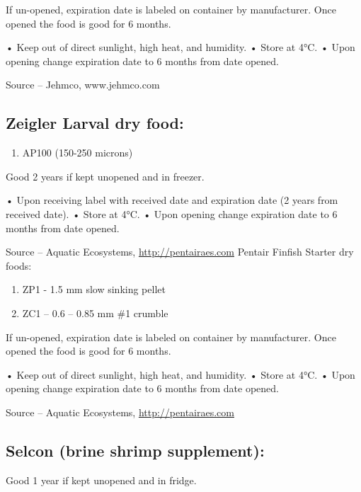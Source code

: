 \documentclass[
]{book}
\providecommand{\tightlist}{%
  \setlength{\itemsep}{0pt}\setlength{\parskip}{0pt}}
\begin{document}
If un-opened, expiration date is labeled on container by manufacturer. Once opened the food is good for 6 months.

• Keep out of direct sunlight, high heat, and humidity.
• Store at 4°C.
• Upon opening change expiration date to 6 months from date opened.

Source -- Jehmco, www.jehmco.com

\hypertarget{zeigler-larval-dry-food}{%
\subsection{Zeigler Larval dry food:}\label{zeigler-larval-dry-food}}

\begin{enumerate}
\def\labelenumi{\arabic{enumi}.}
\tightlist
\item
  AP100 (150-250 microns)
\end{enumerate}

Good 2 years if kept unopened and in freezer.

• Upon receiving label with received date and expiration date (2 years from received date).
• Store at 4°C.
• Upon opening change expiration date to 6 months from date opened.

Source -- Aquatic Ecosystems, \url{http://pentairaes.com}
Pentair Finfish Starter dry foods:

\begin{enumerate}
\def\labelenumi{\arabic{enumi}.}
\setcounter{enumi}{1}
\tightlist
\item
  ZP1 - 1.5 mm slow sinking pellet
\item
  ZC1 -- 0.6 -- 0.85 mm \#1 crumble
\end{enumerate}

If un-opened, expiration date is labeled on container by manufacturer. Once opened the food is good for 6 months.

• Keep out of direct sunlight, high heat, and humidity.
• Store at 4°C.
• Upon opening change expiration date to 6 months from date opened.

Source -- Aquatic Ecosystems, \url{http://pentairaes.com}

\hypertarget{selcon-brine-shrimp-supplement}{%
\subsection{Selcon (brine shrimp supplement):}\label{selcon-brine-shrimp-supplement}}

Good 1 year if kept unopened and in fridge.
\end{document}
